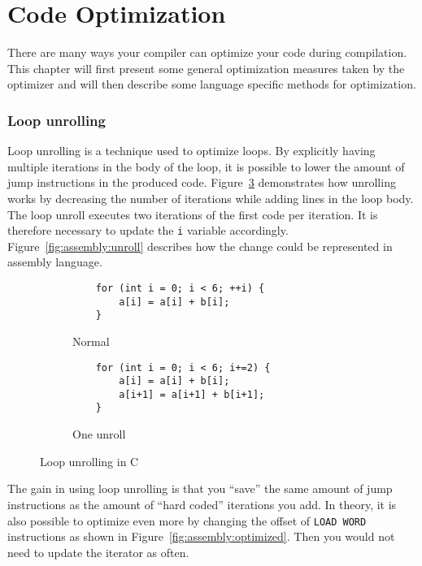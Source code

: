 \section{Code Optimization}

There are many ways your compiler can optimize your code during compilation. This chapter will first present some general optimization measures taken by the optimizer and will then describe some language specific methods for optimization.

\subsubsection{Loop unrolling}
Loop unrolling is a technique used to optimize loops. By explicitly having multiple iterations in the body of the loop, it is possible to lower the amount of jump instructions in the produced code. Figure~\ref{fig:c:unroll} demonstrates how unrolling works by decreasing the number of iterations while adding lines in the loop body. The loop unroll executes two iterations of the first code per iteration. It is therefore necessary to update the \texttt{i} variable accordingly. Figure~\ref{fig:assembly:unroll} describes how the change could be represented in assembly language.

\ifrelease
\begin{figure}
    \centering
    \begin{subfigure}{.5\textwidth}
        \centering
        \begin{verbatim}
    for (int i = 0; i < 6; ++i) {
        a[i] = a[i] + b[i];
    }

        \end{verbatim}
        \caption{Normal}
        \label{fig:c:unroll:normal}
    \end{subfigure}%
    \begin{subfigure}{.5\textwidth}
        \centering
        \begin{verbatim}
    for (int i = 0; i < 6; i+=2) {
        a[i] = a[i] + b[i];
        a[i+1] = a[i+1] + b[i+1];
    }
        \end{verbatim}
        \caption{One unroll}
        \label{fig:c:unroll:unroll}
    \end{subfigure}
    \caption{Loop unrolling in C}
    \label{fig:c:unroll}
\end{figure}
\fi

The gain in using loop unrolling is that you \enquote{save} the same amount of jump instructions as the amount of \enquote{hard coded} iterations you add. In theory, it is also possible to optimize even more by changing the offset of \texttt{LOAD WORD} instructions as shown in Figure~\ref{fig:assembly:optimized}. Then you would not need to update the iterator as often.

